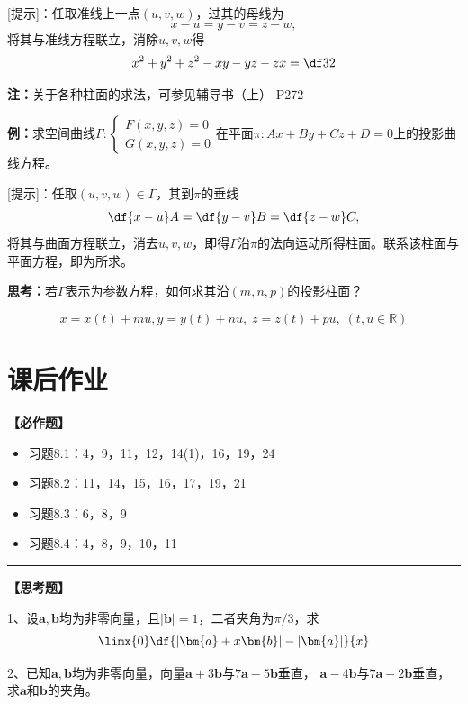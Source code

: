 [提示]：任取准线上一点$(u,v,w)$，过其的母线为
$$x-u=y-v=z-w,$$
将其与准线方程联立，消除$u,v,w$得
$$x^2+y^2+z^2-xy-yz-zx=\df32$$

{\bf 注：}关于各种柱面的求法，可参见辅导书（上）-P272

{\bf 例：}求空间曲线$\Gamma:\left\{\begin{array}{l}
F(x,y,z)=0\\ G(x,y,z)=0
\end{array}\right.$在平面$\pi:Ax+By+Cz+D=0$上的投影曲线方程。

[提示]：任取$(u,v,w)\in\Gamma$，其到$\pi$的垂线
$$\df{x-u}A=\df{y-v}B=\df{z-w}C,$$
将其与曲面方程联立，消去$u,v,w$，即得$\Gamma$沿$\pi$的法向运动所得柱面。联系该柱面与
平面方程，即为所求。

{\bf 思考：}若$\Gamma$表示为参数方程，如何求其沿$(m,n,p)$的投影柱面？

$$x=x(t)+mu,y=y(t)+nu,\;z=z(t)+pu,\;(t,u\in\mathbb{R})$$

\newpage

\section*{课后作业}

{\bf 【必作题】}

\begin{itemize}
  \setlength{\itemindent}{1cm}
  \item 习题8.1：4，9，11，12，14(1)，16，19，24
  \item 习题8.2：11，14，15，16，17，19，21
  \item 习题8.3：6，8，9
  \item 习题8.4：4，8，9，10，11
\end{itemize}

\bigskip

\hrule

\bigskip
\bigskip

{\bf 【思考题】}


1、设$\bm{a},\bm{b}$均为非零向量，且$|\bm{b}|=1$，二者夹角为$\pi/3$，求
$$\limx{0}\df{|\bm{a}+x\bm{b}|-|\bm{a}|}{x}$$

2、已知$\bm{a},\bm{b}$均为非零向量，向量$\bm{a}+3\bm{b}$与$7\bm{a}-5\bm{b}$垂直，
$\bm{a}-4\bm{b}$与$7\bm{a}-2\bm{b}$垂直，求$\bm{a}$和$\bm{b}$的夹角。

